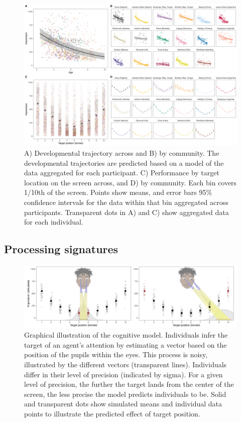 \documentclass[
  man,floatsintext]{apa7}
\begin{document}
\begin{figure}
\includegraphics[width=1\linewidth]{../figures/pvis_pred} \caption{A) Developmental trajectory across and B) by community. The developmental trajectories are predicted based on a model of the data aggregated for each participant. C) Performance by target location on the screen across, and D) by community. Each bin covers 1/10th of the screen. Points show means, and error bars 95\% confidence intervals for the data within that bin aggregated across participants. Transparent dots in A) and C) show aggregated data for each individual.}\label{fig:fig2}
\end{figure}

\hypertarget{processing-signatures-1}{%
\subsection{Processing signatures}\label{processing-signatures-1}}

\begin{figure}

{\centering \includegraphics[width=1\linewidth]{../figures/fig1_3} 

}

\caption{Graphical illustration of the cognitive model. Individuals infer the target of an agent’s attention by estimating a vector based on the position of the pupils within the eyes. This process is noisy, illustrated by the different vectors (transparent lines). Individuals differ in their level of precision (indicated by sigma). For a given level of precision, the further the target lands from the center of the screen, the less precise the model predicts individuals to be. Solid and transparent dots show simulated means and individual data points to illustrate the predicted effect of target position.}\label{fig:fig12}
\end{figure}
\end{document}
